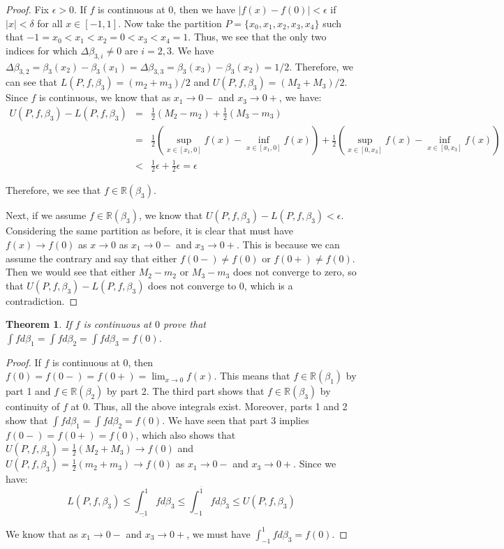 \documentclass[psamsfonts]{amsart}
\newtheorem{thm}{Theorem}[section]
\theoremstyle{definition}
\theoremstyle{remark}
\numberwithin{equation}{section}
\begin{document}
\begin{proof}
Fix $\epsilon > 0$. If $f$ is continuous at $0$, then we have $|f(x) - f(0)| < \epsilon$ if $|x| < \delta$ for all $x \in [-1,1]$. Now take the partition $P = \{x_0, x_1, x_2, x_3, x_4 \}$ such that $-1 = x_0 < x_1 < x_2 = 0 < x_3 < x_4 = 1$. Thus, we see that the only two indices for which $\Delta \beta_{3,i} \neq 0$ are $i = 2,3$. We have $\Delta \beta_{3,2} = \beta_3(x_2) - \beta_3(x_1) = \Delta \beta_{3,3} = \beta_3(x_3) - \beta_3(x_2) = 1/2$. Therefore, we can see that $L(P,f,\beta_3) = (m_2 + m_3)/2$ and $U(P,f,\beta_3) = (M_2 + M_3) /2$. Since $f$ is continuous, we know that as $x_1 \to 0-$ and $x_3 \to 0+$, we have:
\begin{eqnarray}
U(P,f,\beta_3) - L(P,f,\beta_3) &=& \frac{1}{2} (M_2 - m_2)  + \frac{1}{2} ( M_3 - m_3) \\
&=& \frac{1}{2} \left(\sup_{x \in [x_1,0]} f(x) - \inf_{x \in [x_1,0]} f(x) \right) + \frac{1}{2} \left( \sup_{x \in [0,x_3]} f(x) - \inf_{x \in [0,x_3]} f(x) \right) \\
&<& \frac{1}{2} \epsilon + \frac{1}{2} \epsilon = \epsilon
\end{eqnarray}

Therefore, we see that $f \in \mathbb{R}(\beta_3)$. 

Next, if we assume $f \in \mathbb{R}(\beta_3)$, we know that $U(P,f,\beta_3) - L(P,f,\beta_3) < \epsilon$. Considering the same partition as before, it is clear that must have $f(x) \to f(0)$ as $x \to 0$ as $x_1 \to 0 -$ and $x_3 \to 0 +$. This is because we can assume the contrary and say that either $f(0-) \neq f(0)$ or $f(0+) \neq f(0)$. Then we would see that either $M_2 - m_2$ or $M_3 - m_3$ does not converge to zero, so that $U(P,f,\beta_3) - L(P,f,\beta_3)$ does not converge to 0, which is a contradiction. 
\end{proof}

\begin{thm}
If $f$ is continuous at $0$ prove that $\int f d \beta_1 = \int f d \beta_2 = \int f d \beta_3 = f(0)$. 
\end{thm}

\begin{proof}
If $f$ is continuous at $0$, then $f(0) = f(0-) = f(0+) = \lim_{x \to 0} f(x)$. This means that $f \in \mathbb{R}(\beta_1)$ by part 1 and $f \in \mathbb{R}(\beta_2)$ by part 2. The third part shows that $f \in \mathbb{R}(\beta_3)$ by continuity of $f$ at $0$. Thus, all the above integrals exist. Moreover, parts 1 and 2 show that $\int f d \beta_1 = \int f d \beta_2 = f(0)$. We have seen that part 3 implies $f(0-) = f(0+) = f(0)$, which also shows that $U(P,f,\beta_3) = \frac{1}{2}(M_2 + M_3) \to f(0)$ and $U(P,f,\beta_3) = \frac{1}{2}(m_2 + m_3) \to f(0)$ as $x_1 \to 0-$ and $x_3 \to 0+$. Since we have:
\begin{equation}
L(P,f,\beta_3) \leq \int_{\underline{-1}}^{1} f d \beta_3 \leq \int_{{-1}}^{\overline{1}} f d \beta_3 \leq U(P,f,\beta_3)
\end{equation}

We know that as $x_1 \to 0-$ and $x_3 \to 0+$, we must have $\int_{-1}^1 f d \beta_3 = f(0)$. 
\end{proof}
\end{document}
